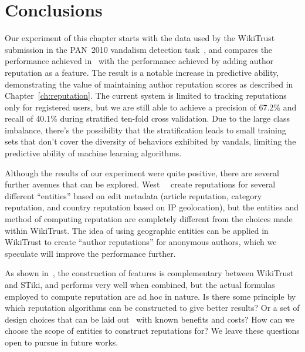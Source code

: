 \section{Conclusions}

Our experiment of this chapter starts with the data used by the
WikiTrust submission in the PAN~2010 vandalism detection
task~\cite{Adler2010b}, and compares the performance achieved
in~\cite{Potthast2010b}
with the performance achieved by adding author reputation as a feature.
The result is a notable increase in predictive ability, demonstrating
the value of maintaining author reputation scores as described in
Chapter~\ref{ch:reputation}.
The current system is limited to tracking reputations only for
registered users, but we are still able to achieve a precision of 67.2\%
and recall of 40.1\% during stratified ten-fold cross validation.
Due to the large class imbalance, there's the possibility that the
stratification leads to small training sets that don't cover the
diversity of behaviors exhibited by vandals, limiting the predictive
ability of machine learning algorithms.

Although the results of our experiment were quite positive, there are
several further avenues that can be explored.
West~\etal~\cite{West2010} create reputations for several different
``entities'' based on edit metadata (\eg article reputation, category
reputation, and country reputation based on IP geolocation), but the
entities and method of computing reputation are completely different
from the choices made within WikiTrust.
The idea of using geographic entities can be applied in WikiTrust to
create ``author reputations'' for anonymous authors, which we speculate
will improve the performance further.

As shown in~\cite{Adler2011a}, the construction of features is complementary
between WikiTrust and STiki, and performs very well when combined, but the
actual formulas employed to compute reputation are ad hoc in nature.
Is there some principle by which reputation algorithms can be
constructed to give better results?
Or a set of design choices that can be laid out~\cite{Adler2011b} with
known benefits and costs?
How can we choose the scope of entities to construct reputations for?
We leave these questions open to pursue in future works.



